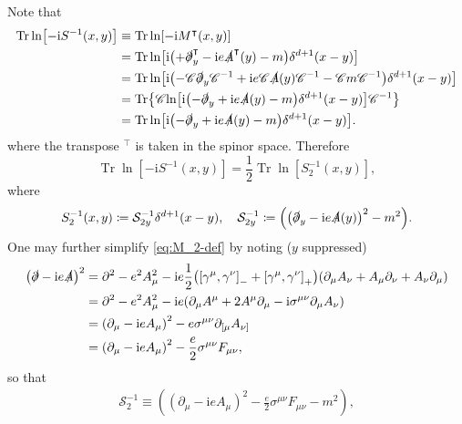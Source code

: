 \documentclass[12pt]{article}
\newcommand\mi{\mathrm{i}} %
\DeclareMathOperator{\Tr}{Tr}
\newcommand{\rbr}[1]{{\left(#1\right)}}
\newcommand{\sbr}[1]{{\left[#1\right]}}
\newcommand{\rfun}[2]{{#1}\mathopen{}\left(#2\right)\mathclose{}}
\newcommand{\sfun}[2]{{#1}\mathopen{}\left[#2\right]\mathclose{}}
\newcommand{\cfun}[2]{{#1}\mathopen{}\left\{#2\right\}\mathclose{}}
\begin{document}
Note that
\begin{align}
\Tr \sfun{\ln}{-\mi \rfun{S^{-1}}{x, y}} &\equiv
\Tr \sfun{\ln}{-\mi \rfun{M^\intercal}{x, y}} \nonumber \\
&= \Tr \sfun{\ln}{\mi\rbr{ +\slashed{\partial}_y^\intercal -\mi e 
\rfun{\slashed{A}^\intercal}{y} - m}\rfun{\delta^{d+1}}{x-y}} \nonumber \\
&= \Tr \sfun{\ln}{\mi\rbr{ -\mathscr{C}\slashed{\partial}_y\mathscr{C}^{-1}
+\mi e \mathscr{C}\rfun{\slashed{A}}{y}\mathscr{C}^{-1}
-\mathscr{C}m\mathscr{C}^{-1}} \rfun{\delta^{d+1}}{x-y}} \nonumber \\
&= \cfun{\Tr}{\mathscr{C}\sfun{\ln}{\mi\rbr{-\slashed{\partial}_y
+\mi e \rfun{\slashed{A}}{y} -m} \rfun{\delta^{d+1}}{x-y}}\mathscr{C}^{-1}} 
\nonumber \\
&= \Tr \sfun{\ln}{\mi\rbr{-\slashed{\partial}_y
+\mi e \rfun{\slashed{A}}{y} -m} \rfun{\delta^{d+1}}{x-y}}.
\end{align}
where the transpose ${}^\intercal$ is taken in the spinor space. Therefore
\begin{equation}
\Tr \sfun{\ln}{-\mi \rfun{S^{-1}}{x, y}} =
\frac{1}{2} \Tr \sfun{\ln}{\rfun{S_2^{-1}}{x, y}},
\label{eq:Tr-M_2}
\end{equation}
where
\begin{align}
\rfun{S_2^{-1}}{x, y} \coloneqq \mathcal{S}_{2y}^{-1} 
\rfun{\delta^{d+1}}{x-y},\quad
\mathcal{S}_{2y}^{-1} \coloneqq \rbr{\rbr{\slashed{\partial}_y-\mi e 
\rfun{\slashed{A}}{y}}^2 - m^2}.
\label{eq:M_2-def}
\end{align}
One may further simplify \cref{eq:M_2-def} by noting ($y$ suppressed)
\begin{align}
\rbr{\slashed{\partial} -\mi e \slashed{A}}^2 &=
\partial^2 - e^2 A_\mu^2 -\mi e \frac{1}{2}\rbr{\sbr{\gamma^\mu, \gamma^\nu}_- 
+ \sbr{\gamma^\mu, \gamma^\nu}_+}
\rbr{\partial_\mu A_\nu + A_\mu \partial_\nu + A_\nu \partial_\mu} 
\nonumber \\
&= \partial^2 - e^2 A_\mu^2 - \mi e \rbr{\partial_\mu A^\mu + 2A^\mu 
\partial_\mu - \mi \sigma^{\mu\nu} \partial_\mu A_\nu} \nonumber \\
&= \rbr{\partial_\mu - \mi e A_\mu}^2
- e \sigma^{\mu\nu} \partial_{[\mu} A_{\nu]} \nonumber \\
&= \rbr{\partial_\mu - \mi e A_\mu}^2 - \frac{e}{2} \sigma^{\mu\nu} F_{\mu\nu},
\end{align}
so that
\begin{align}
\mathcal{S}_{2}^{-1} \equiv \rbr{\rbr{\partial_{\mu} - \mi e A_\mu}^2 - 
\frac{e}{2} \sigma^{\mu\nu} F_{\mu\nu} - m^2},
\label{eq:M_2-simp}
\end{align}
\end{document}
